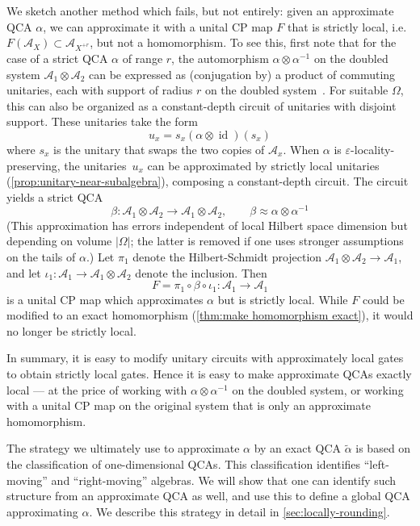 \documentclass[11pt,reqno]{amsart}
\theoremstyle{definition}
\theoremstyle{remark}
\numberwithin{equation}{section}
\DeclareMathOperator{\id}{id}
\newcommand{\eps}{\varepsilon}
\newcommand{\cA}{\mathcal A}
\begin{document}
We sketch another method which fails, but not entirely: given an approximate QCA $\alpha$, we can approximate it with a unital CP map $F$ that is strictly local, i.e.\ $F(\cA_X) \subset \cA_{X^{+r}}$, but not a homomorphism.
To see this, first note that for the case of a strict QCA $\alpha$ of range $r$, the automorphism $\alpha \otimes \alpha^{-1}$ on the doubled system $\cA_1 \otimes \cA_2$ can be expressed as (conjugation by) a product of commuting unitaries, each with support of radius $r$ on the doubled system~\cite[Prop.~1]{gross2012index}.
For suitable $\Omega$, this can also be organized as a constant-depth circuit of unitaries with disjoint support.
These unitaries take the form
\begin{equation*}
    u_x = s_x (\alpha \otimes \id)(s_x)
\end{equation*}
where $s_x$ is the unitary that swaps the two copies of $\cA_x$. When $\alpha$ is $\eps$-locality-preserving, the unitaries~$u_x$ can be approximated by strictly local unitaries (\cref{prop:unitary-near-subalgebra}), composing a constant-depth circuit.
The circuit yields a strict QCA
\begin{equation*}
    \beta : \cA_1 \otimes \cA_2 \to \cA_1 \otimes \cA_2, \qquad \beta \approx \alpha \otimes \alpha^{-1}
\end{equation*}
(This approximation has errors independent of local Hilbert space dimension but depending on volume $|\Omega|$; the latter is removed if one uses stronger assumptions on the tails of $\alpha$.)
Let $\pi_1$ denote the Hilbert-Schmidt projection $\cA_1 \otimes \cA_2 \to \cA_1$, and let $\iota_1 : \cA_1 \to \cA_1 \otimes \cA_2$ denote the inclusion.
Then
\begin{equation*}
    F = \pi_1 \circ \beta \circ \iota_1 : \cA_1 \to \cA_1
\end{equation*}
is a unital CP map which approximates $\alpha$ but is strictly local.  While $F$ could be modified to an exact homomorphism (\cref{thm:make homomorphism exact}), it would no longer be strictly local.


In summary, it is easy to modify unitary circuits with approximately local gates to obtain strictly local gates.
 Hence it is easy to make approximate QCAs exactly local --- at the price of working with $\alpha \otimes \alpha^{-1}$ on the doubled system, or working with a unital CP map on the original system that is only an approximate homomorphism.

The strategy we ultimately use to approximate $\alpha$ by an exact QCA $\tilde \alpha$ is based on the classification of one-dimensional QCAs. This classification identifies ``left-moving'' and ``right-moving'' algebras. We will show that one can identify such structure from an approximate QCA as well, and use this to define a global QCA approximating $\alpha$. We describe this strategy in detail in \cref{sec:locally-rounding}.
\end{document}

